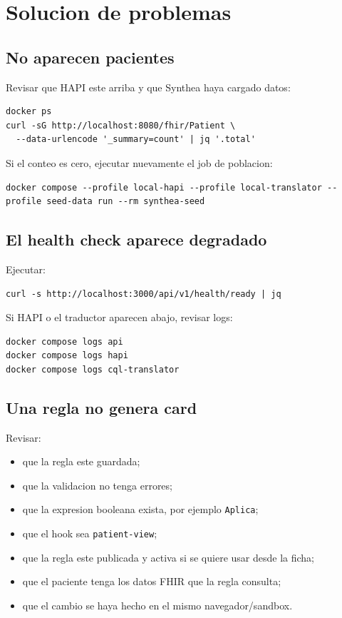 \section{Solucion de problemas}

\subsection{No aparecen pacientes}

Revisar que HAPI este arriba y que Synthea haya cargado datos:

\begin{lstlisting}
docker ps
curl -sG http://localhost:8080/fhir/Patient \
  --data-urlencode '_summary=count' | jq '.total'
\end{lstlisting}

Si el conteo es cero, ejecutar nuevamente el job de poblacion:

\begin{lstlisting}
docker compose --profile local-hapi --profile local-translator --profile seed-data run --rm synthea-seed
\end{lstlisting}

\subsection{El health check aparece degradado}

Ejecutar:

\begin{lstlisting}
curl -s http://localhost:3000/api/v1/health/ready | jq
\end{lstlisting}

Si HAPI o el traductor aparecen abajo, revisar logs:

\begin{lstlisting}
docker compose logs api
docker compose logs hapi
docker compose logs cql-translator
\end{lstlisting}

\subsection{Una regla no genera card}

Revisar:

\begin{itemize}
  \item que la regla este guardada;
  \item que la validacion no tenga errores;
  \item que la expresion booleana exista, por ejemplo \texttt{Aplica};
  \item que el hook sea \texttt{patient-view};
  \item que la regla este publicada y activa si se quiere usar desde la ficha;
  \item que el paciente tenga los datos FHIR que la regla consulta;
  \item que el cambio se haya hecho en el mismo navegador/sandbox.
\end{itemize}


